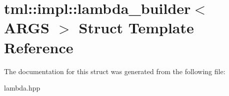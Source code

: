 \hypertarget{structtml_1_1impl_1_1lambda__builder}{\section{tml\+:\+:impl\+:\+:lambda\+\_\+builder$<$ A\+R\+G\+S $>$ Struct Template Reference}
\label{structtml_1_1impl_1_1lambda__builder}
}


The documentation for this struct was generated from the following file\+:\begin{DoxyCompactItemize}
\item 
lambda.\+hpp\end{DoxyCompactItemize}
